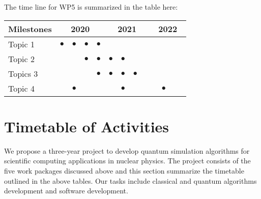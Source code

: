 \documentclass[10pt]{article}
\begin{document}
The time line for WP5 is summarized in the table here:
\begin{footnotesize}
\begin{center}
\begin{tabular}{|l|c|c|c|c|c|c|c|c|c|c|c|c|}
\hline
\multicolumn{1}{|l}{Milestones } & \multicolumn{4}{|c|}{ 2020 } & \multicolumn{4}{c|}{ 2021 } & \multicolumn{4}{c|}{ 2022 } \\
\hline
Topic 1 &$\bullet$ &$\bullet$ &$\bullet$ &$\bullet$ & & & & & & & &  \\
\hline
Topic 2 & & &$\bullet$ &$\bullet$ &$\bullet$ &$\bullet$ & & & & & &  \\
\hline
Topics 3 & & & & $\bullet$ &$\bullet$ &$\bullet$ &$\bullet$ & & & & &  \\
\hline
Topic 4 & &$\bullet$ & & & &$\bullet$ & & & &$\bullet$ & &  \\
\hline

\end{tabular}
\end{center}
\end{footnotesize}











\section{Timetable of Activities}
We propose a three-year project to develop quantum simulation algorithms for scientific computing applications in nuclear physics. The project consists of the five work packages discussed above and this section summarize the timetable outlined in the above tables. Our tasks include classical and quantum algorithms
development and software development.
\end{document}
